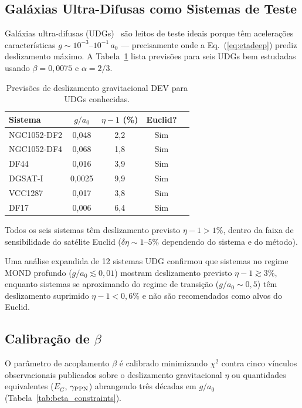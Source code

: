 \documentclass[aps,prd,twocolumn,showpacs,superscriptaddress]{revtex4-2}
\newcommand{\aO}{a_0}
\begin{document}
\subsection{Galáxias Ultra-Difusas como Sistemas de Teste}

Galáxias ultra-difusas (UDGs)~\cite{vanDokkum2015} são leitos
de teste ideais porque têm acelerações características
$g \sim 10^{-3}$--$10^{-1}\,\aO$ — precisamente onde a
Eq.~(\ref{eq:etadeep}) prediz deslizamento máximo.
A Tabela~\ref{tab:udg} lista previsões para seis UDGs bem
estudadas usando $\beta = 0{,}0075$ e $\alpha = 2/3$.

\begin{table}[h]
\caption{Previsões de deslizamento gravitacional DEV para UDGs conhecidas.}
\label{tab:udg}
\begin{ruledtabular}
\begin{tabular}{lcccc}
Sistema & $g/\aO$ & $\eta-1$ (\%) & Euclid? \\
\hline
NGC1052-DF2 & 0,048 & 2,2 & Sim \\
NGC1052-DF4 & 0,068 & 1,8 & Sim \\
DF44        & 0,016 & 3,9 & Sim \\
DGSAT-I     & 0,0025 & 9,9 & Sim \\
VCC1287     & 0,017  & 3,8 & Sim \\
DF17        & 0,006  & 6,4 & Sim \\
\end{tabular}
\end{ruledtabular}
\end{table}

Todos os seis sistemas têm deslizamento previsto $\eta - 1 > 1\%$,
dentro da faixa de sensibilidade do satélite Euclid
($\delta\eta \sim 1$--$5\%$ dependendo do sistema e do método).

Uma análise expandida de 12 sistemas UDG confirmou que sistemas
no regime MOND profundo ($g/\aO \lesssim 0{,}01$) mostram
deslizamento previsto $\eta - 1 \gtrsim 3\%$, enquanto sistemas
se aproximando do regime de transição ($g/\aO \sim 0{,}5$) têm
deslizamento suprimido $\eta-1 < 0{,}6\%$ e não são recomendados
como alvos do Euclid.

\subsection{Calibração de $\beta$}

O parâmetro de acoplamento $\beta$ é calibrado minimizando $\chi^2$
contra cinco vínculos observacionais publicados sobre o deslizamento
gravitacional $\eta$ ou quantidades equivalentes ($E_G$,
$\gamma_{\rm PPN}$) abrangendo três décadas em $g/\aO$
(Tabela~\ref{tab:beta_constraints}).
\end{document}
